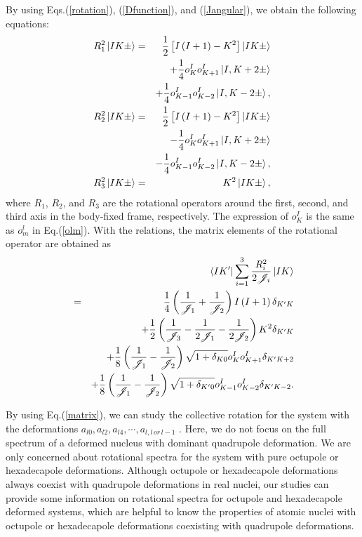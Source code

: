 \documentclass[twocolumn,prc,showpacs,preprintnumbers,superscriptaddress,floatfix]{revtex4}
\begin{document}
By using Eqs.(\ref{rotation}), (\ref{Dfunction}), and (\ref{Jangular}), we
obtain the following equations:
\begin{eqnarray}
R_{1}^{2}\left\vert IK\pm \right\rangle &=&\frac{1}{2}\left[ I\left(
I+1\right) -K^{2}\right] \left\vert IK\pm \right\rangle  \notag \\
&&+\frac{1}{4}o_{K}^{I}o_{K+1}^{I}\left\vert I,K+2\pm \right\rangle  \notag
\\
&&+\frac{1}{4}o_{K-1}^{I}o_{K-2}^{I}\left\vert I,K-2\pm \right\rangle , \\
R_{2}^{2}\left\vert IK\pm \right\rangle &=&\frac{1}{2}\left[ I\left(
I+1\right) -K^{2}\right] \left\vert IK\pm \right\rangle  \notag \\
&&-\frac{1}{4}o_{K}^{I}o_{K+1}^{I}\left\vert I,K+2\pm \right\rangle  \notag
\\
&&-\frac{1}{4}o_{K-1}^{I}o_{K-2}^{I}\left\vert I,K-2\pm \right\rangle , \\
R_{3}^{2}\left\vert IK\pm \right\rangle &=&K^{2}\left\vert IK\pm
\right\rangle ,
\end{eqnarray}%
where $R_{1}$, $R_{2}$, and $R_{3}$ are the rotational operators around the
first, second, and third axis in the body-fixed frame, respectively. The
expression of $o_{K}^{I}$ is the same as $o_{m}^{l}$ in Eq.(\ref{olm}). With
the relations, the matrix elements of the rotational operator are obtained
as
\begin{eqnarray}
&&\left\langle IK^{\prime }\right\vert \sum\limits_{i=1}^{3}\frac{R_{i}^{2}}{%
2\mathscr{J}_{i}}\left\vert IK\right\rangle  \notag \\
&=&\frac{1}{4}\left( \frac{1}{\mathscr{J}_{1}}+\frac{1}{\mathscr{J}_{2}}%
\right) I\left( I+1\right) \delta _{K^{\prime }K}  \notag \\
&&+\frac{1}{2}\left( \frac{1}{\mathscr{J}_{3}}-\frac{1}{2\mathscr{J}_{1}}-%
\frac{1}{2\mathscr{J}_{2}}\right) K^{2}\delta _{K^{\prime }K}  \notag \\
&&+\frac{1}{8}\left( \frac{1}{\mathscr{J}_{1}}-\frac{1}{\mathscr{J}_{2}}%
\right) \sqrt{1+\delta _{K0}}o_{K}^{I}o_{K+1}^{I}\delta _{K^{\prime }K+2}
\notag \\
&&+\frac{1}{8}\left( \frac{1}{\mathscr{J}_{1}}-\frac{1}{\mathscr{J}_{2}}%
\right) \sqrt{1+\delta _{K^{\prime }0}}o_{K-1}^{I}o_{K-2}^{I}\delta
_{K^{\prime }K-2}.  \label{matrix}
\end{eqnarray}

By using Eq.(\ref{matrix}), we can study the collective rotation for the
system with the deformations $a_{l0},a_{l2},a_{l4},\cdots ,a_{l,l\,or\,l-1}$%
. Here, we do not focus on the full spectrum of a deformed nucleus with
dominant quadrupole deformation. We are only concerned about rotational
spectra for the system with pure octupole or hexadecapole deformations.
Although octupole or hexadecapole deformations always coexist with
quadrupole deformations in real nuclei, our studies can provide some
information on rotational spectra for octupole and hexadecapole deformed
systems, which are helpful to know the properties of atomic nuclei with
octupole or hexadecapole deformations coexisting with quadrupole
deformations.
\end{document}
